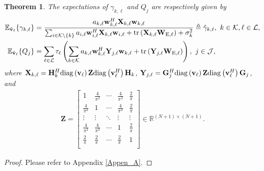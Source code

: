 \documentclass[12pt,draftclsnofoot, onecolumn]{IEEEtran}
\theoremstyle{plain}
\newtheorem{theo}{Theorem}
\begin{document}
\begin{sloppypar}
\begin{theo}\label{theo}
	\vspace{-3mm}
	The expectations of $\gamma_{k,\ell}$ and $Q_j$ are respectively given by
	{\addtolength{\jot}{5pt}
	\begin{align}
	\mathbb E_{\tilde{\mathbf v}_\ell}\{ \gamma_{k,\ell}\} & = \frac{a_{k,\ell}\mathbf w_{k,\ell}^H\mathbf X_{k,\ell}\mathbf w_{k,\ell}}{\sum_{i\in \mathcal K\backslash\{k\}}a_{i,\ell}\mathbf w_{i,\ell}^H\mathbf X_{k,\ell}\mathbf w_{i,\ell} + {\rm tr}\left(\mathbf X_{k,\ell}\mathbf W_{\mathrm E,\ell}\right)+ \sigma_k^2} \triangleq \hat \gamma_{k,\ell}, \  k\in\mathcal K, \ell\in\mathcal L, \label{expecta_SINR}\\ 
	\mathbb E_{\tilde{\mathbf v}_\ell}\{ Q_j\} & = \sum_{\ell\in\mathcal L}\tau_\ell\left(\sum_{k\in\mathcal K}a_{k,\ell}\mathbf w_{k,\ell}^H\mathbf Y_{j,\ell}\mathbf w_{k,\ell} + {\rm tr}\left(\mathbf Y_{j,\ell}\mathbf W_{\mathrm E, \ell} \right) \right), \  j\in\mathcal J, \label{expecta_E}
	\end{align}}%
	where $\mathbf X_{k,\ell} = \mathbf H_k^H{\rm diag}\left(\mathbf v_\ell\right)\mathbf Z{\rm diag}\left(\mathbf v_{\ell}^H\right)\mathbf H_k$, $\mathbf Y_{j,\ell} = \mathbf G_j^H{\rm diag}\left(\mathbf v_\ell\right)\mathbf Z{\rm diag}\left(\mathbf v_{\ell}^H\right)\mathbf G_j$, and 
	\begin{align}
	\mathbf Z = \begin{bmatrix}
	1& \frac{4}{\pi^2} & \cdots & \frac{4}{\pi^2} & \frac{2}{\pi} \\
	\frac{4}{\pi^2} & 1 & \cdots & \frac{4}{\pi^2}  & \frac{2}{\pi} \\
	\vdots & \vdots & \ddots & \vdots & \vdots \\
	\frac{4}{\pi^2} & \frac{4}{\pi^2} & \cdots &  1 & \frac{2}{\pi} \\
	\frac{2}{\pi} & \frac{2}{\pi} & \cdots & \frac{2}{\pi} & 1 \\
	\end{bmatrix} \in\mathbb R^{\left(N+1\right) \times \left(N+1\right)}.
	\end{align} 
\end{theo}
\begin{proof}
Please refer to Appendix \ref{Appen_A}.	
\end{proof}


\end{sloppypar}
\end{document}
